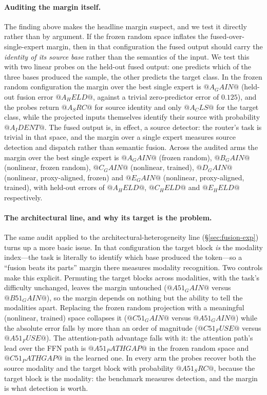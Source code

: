 \paragraph{Auditing the margin itself.}
The finding above makes the headline margin suspect, and we test it directly rather than by
argument. If the frozen random space inflates the fused-over-single-expert margin, then in that
configuration the fused output should carry the \emph{identity of its source base} rather than the
semantics of the input. We test this with two linear probes on the held-out fused output: one
predicts which of the three bases produced the sample, the other predicts the target class. In the
frozen random configuration the margin over the best single expert is $@A_GAIN@$ (held-out fusion
error $@A_HELD@$, against a trivial zero-predictor error of $0.125$), and the probes return
$@A_SRC@$ for source identity and only $@A_CLS@$ for the target class, while the projected inputs
themselves identify their source with probability $@A_IDENT@$. The fused output is, in effect, a
source detector: the router's task is trivial in that space, and the margin over a single expert
measures source detection and dispatch rather than semantic fusion. Across the audited arms the
margin over the best single expert is $@A_GAIN@$ (frozen random), $@B_GAIN@$ (nonlinear, frozen
random), $@C_GAIN@$ (nonlinear, trained), $@D_GAIN@$ (nonlinear, proxy-aligned, frozen) and
$@E_GAIN@$ (nonlinear, proxy-aligned, trained), with held-out errors of $@A_HELD@$, $@C_HELD@$ and
$@E_HELD@$ respectively.

\paragraph{The architectural line, and why its target is the problem.} The same audit applied to the architectural-heterogeneity line (\S\ref{sec:fusion-exp}) turns up a more basic issue. In that configuration the target block \emph{is} the modality index---the task is literally to identify which base produced the token---so a ``fusion beats its parts'' margin there measures modality recognition. Two controls make this explicit. Permuting the target blocks across modalities, with the task's difficulty unchanged, leaves the margin untouched ($@A51_GAIN@$ versus $@B51_GAIN@$), so the margin depends on nothing but the ability to tell the modalities apart. Replacing the frozen random projection with a meaningful (nonlinear, trained) space collapses it ($@C51_GAIN@$ versus $@A51_GAIN@$) while the absolute error falls by more than an order of magnitude ($@C51_FUSE@$ versus $@A51_FUSE@$). The attention-path advantage falls with it: the attention path's lead over the FFN path is $@A51_PATHGAP@$ in the frozen random space and $@C51_PATHGAP@$ in the learned one. In every arm the probes recover both the source modality and the target block with probability $@A51_SRC@$, because the target block is the modality: the benchmark measures detection, and the margin is what detection is worth.



